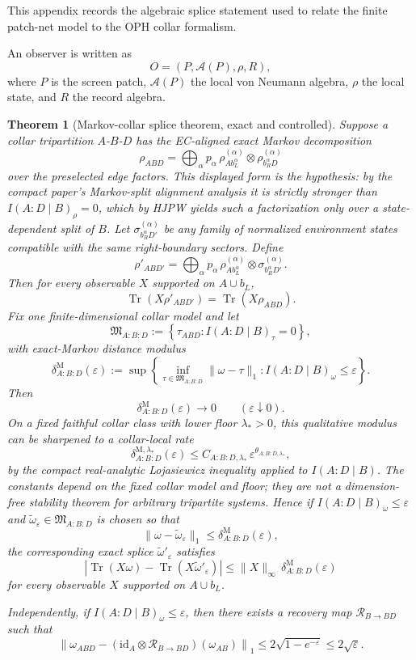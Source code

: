 \documentclass[11pt]{article}
\newtheorem{theorem}{Theorem}[section]
\theoremstyle{remark}
\theoremstyle{plain}
\begin{document}
This appendix records the algebraic splice statement used to relate the finite patch-net model to
the OPH collar formalism.

An observer is written as
\[
O=(P,\mathcal{A}(P),\rho,R),
\]
where $P$ is the screen patch, $\mathcal{A}(P)$ the local von Neumann algebra, $\rho$ the local state, and $R$ the record algebra.

\begin{theorem}[Markov-collar splice theorem, exact and controlled]\label{thm:splice}
Suppose a collar tripartition $A$-$B$-$D$ has the EC-aligned exact Markov decomposition
\[
\rho_{ABD}
=
\bigoplus_{\alpha}
p_\alpha\,
\rho^{(\alpha)}_{A b_L^\alpha}
\otimes
\rho^{(\alpha)}_{b_R^\alpha D}
\]
over the preselected edge factors. This displayed form is the hypothesis: by the compact paper's Markov-split alignment analysis it is strictly stronger than \(I(A:D\mid B)_\rho=0\), which by HJPW yields such a factorization only over a state-dependent split of \(B\).
Let $\sigma_{b_R^\alpha D'}^{(\alpha)}$ be any family of normalized environment states compatible with the same right-boundary sectors. Define
\[
\rho'_{AB D'}
=
\bigoplus_{\alpha}
p_\alpha\,
\rho^{(\alpha)}_{A b_L^\alpha}
\otimes
\sigma_{b_R^\alpha D'}^{(\alpha)}.
\]
Then for every observable $X$ supported on $A\cup b_L$,
\[
\operatorname{Tr}(X\rho'_{AB D'})
=
\operatorname{Tr}(X\rho_{ABD}).
\]
Fix one finite-dimensional collar model and let
\[
\mathfrak M_{A:B:D}
:=
\left\{
\tau_{ABD}: I(A:D\mid B)_\tau=0
\right\},
\]
with exact-Markov distance modulus
\[
\delta^{\mathrm M}_{A:B:D}(\varepsilon)
:=
\sup\left\{
\inf_{\tau\in\mathfrak M_{A:B:D}}\|\omega-\tau\|_1:
I(A:D\mid B)_\omega\le\varepsilon
\right\}.
\]
Then
\[
\delta^{\mathrm M}_{A:B:D}(\varepsilon)\to0
\qquad
(\varepsilon\downarrow0).
\]
On a fixed faithful collar class with lower floor \(\lambda_\ast>0\), this
qualitative modulus can be sharpened to a collar-local rate
\[
\delta^{\mathrm M,\lambda_\ast}_{A:B:D}(\varepsilon)
\le
C_{A:B:D,\lambda_\ast}\,\varepsilon^{\theta_{A:B:D,\lambda_\ast}},
\]
by the compact real-analytic Lojasiewicz inequality applied to
\(I(A:D\mid B)\). The constants depend on the fixed collar model and floor;
they are not a dimension-free stability theorem for arbitrary tripartite
systems.
Hence if \(I(A:D\mid B)_\omega\le \varepsilon\) and \(\widetilde\omega_\varepsilon\in\mathfrak M_{A:B:D}\) is chosen so that
\[
\|\omega-\widetilde\omega_\varepsilon\|_1
\le
\delta^{\mathrm M}_{A:B:D}(\varepsilon),
\]
the corresponding exact splice \(\widetilde\omega'_\varepsilon\) satisfies
\[
\left|
\operatorname{Tr}(X\omega)-\operatorname{Tr}(X\widetilde\omega'_\varepsilon)
\right|
\le
\|X\|_\infty\,
\delta^{\mathrm M}_{A:B:D}(\varepsilon)
\]
for every observable \(X\) supported on \(A\cup b_L\).

Independently, if \(I(A:D\mid B)_\omega\le \varepsilon\), then there exists a recovery map \(\mathcal R_{B\to BD}\) such that
\[
\left\|
\omega_{ABD}
-
(\mathrm{id}_A\otimes \mathcal R_{B\to BD})(\omega_{AB})
\right\|_1
\le
2\sqrt{1-e^{-\varepsilon}}
\le
2\sqrt{\varepsilon}.
\]
\end{theorem}
\end{document}
